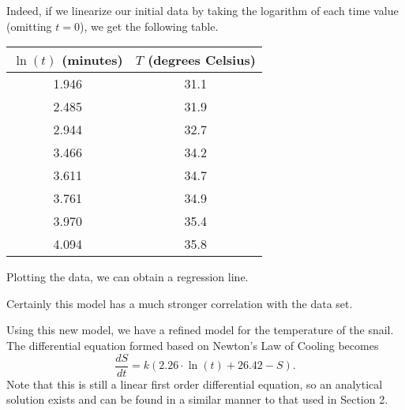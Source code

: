 \documentclass{article}
\begin{document}
   Indeed, if we linearize our initial data by taking the logarithm of each time value (omitting \(t = 0\)), we get the following table.
   \begin{center}
     \begin{tabular}{ |c|c| }
       \hline
       \(\ln(t)\) (minutes) & \(T\) (degrees Celsius) \\
       \hline
       1.946 & 31.1 \\
       \hline
       2.485 & 31.9 \\
       \hline
       2.944 & 32.7 \\
       \hline
       3.466 & 34.2 \\
       \hline
       3.611 & 34.7 \\
       \hline
       3.761 & 34.9 \\
       \hline
       3.970 & 35.4 \\
       \hline
       4.094 & 35.8 \\
       \hline
     \end{tabular}
   \end{center}
   Plotting the data, we can obtain a regression line.
   \begin{center}
   \end{center}
   Certainly this model has a much stronger correlation with the data set.

   Using this new model, we have a refined model for the temperature of the snail.
   The differential equation formed based on Newton's Law of Cooling becomes
   \begin{equation*}
     \frac{dS}{dt} = k \left( 2.26 \cdot \ln(t) + 26.42 - S \right).
   \end{equation*}
   Note that this is still a linear first order differential equation, so an analytical solution exists and can be found in a similar manner to that used in Section 2.
\end{document}
